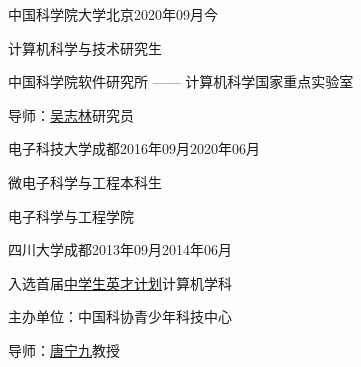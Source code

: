
\begin{eduitem}{中国科学院大学}{北京}{2020年09月}{今}
    \item 计算机科学与技术研究生
    \item 中国科学院软件研究所 —— 计算机科学国家重点实验室
    \item 导师：\href{http://lcs.ios.ac.cn/~wuzl/}{吴志林}研究员
\end{eduitem}

\begin{eduitem}{电子科技大学}{成都}{2016年09月}{2020年06月}
\item 微电子科学与工程本科生
\item 电子科学与工程学院
\end{eduitem}

\begin{eduitem}{四川大学}{成都}{2013年09月}{2014年06月}
\item 入选首届\href{https://www.ycjh.org.cn/}{中学生英才计划}计算机学科
\item 主办单位：中国科协青少年科技中心
\item 导师：\href{http://cs.scu.edu.cn/info/1074/3930.htm}{唐宁九}教授
\end{eduitem}


\endinput